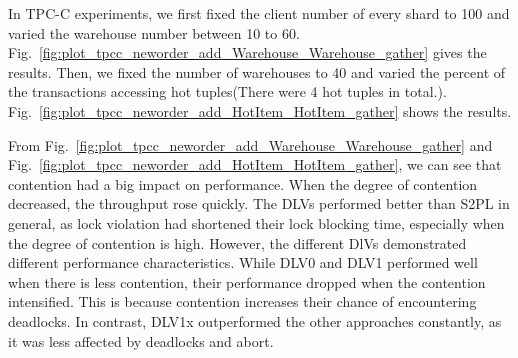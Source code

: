 \documentclass[conference]{IEEEtran}
\begin{document}
In TPC-C experiments, we first fixed the client number of every shard to 100 and varied the warehouse number between 10 to 60.
Fig.~\ref{fig:plot_tpcc_neworder_add_Warehouse_Warehouse_gather} gives the results.
Then, we fixed the number of warehouses to 40 and varied the percent of the transactions accessing hot tuples(There were 4 hot tuples in total.).
Fig.~\ref{fig:plot_tpcc_neworder_add_HotItem_HotItem_gather} shows the results.

From Fig.~\ref{fig:plot_tpcc_neworder_add_Warehouse_Warehouse_gather} and
Fig.~\ref{fig:plot_tpcc_neworder_add_HotItem_HotItem_gather},
we can see that contention had a big impact on performance. When the degree of contention decreased, the throughput rose quickly.
The DLVs performed better than S2PL in general, as lock violation had shortened their lock blocking time, especially when the degree of contention is high.
However, the different DlVs demonstrated different performance characteristics. 
While DLV0 and DLV1 performed well when there is less contention, their performance dropped when the contention intensified.
This is because contention increases their chance of encountering deadlocks.
In contrast, DLV1x outperformed the other approaches constantly, as it was less affected by deadlocks and abort.
\end{document}
